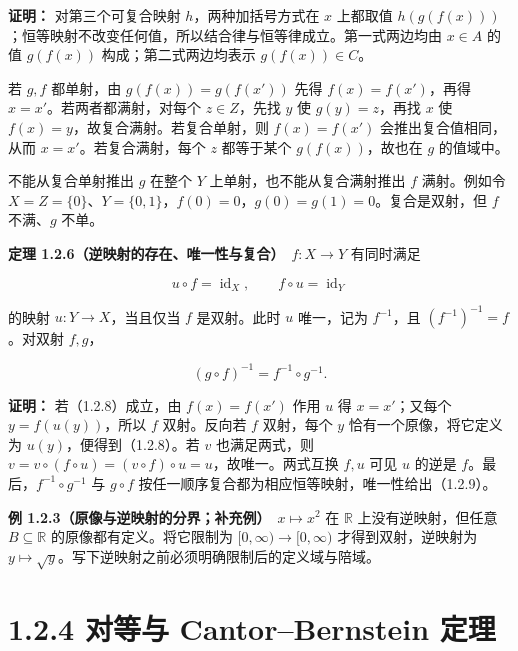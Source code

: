 \documentclass[11pt,a4paper]{article}
\begin{document}
\textbf{证明：} 对第三个可复合映射 \(h\)，两种加括号方式在 \(x\)
上都取值
\(h(g(f(x)))\)；恒等映射不改变任何值，所以结合律与恒等律成立。第一式两边均由
\(x\in A\) 的值 \(g(f(x))\) 构成；第二式两边均表示 \(g(f(x))\in C\)。

若 \(g,f\) 都单射，由 \(g(f(x))=g(f(x'))\) 先得 \(f(x)=f(x')\)，再得
\(x=x'\)。若两者都满射，对每个 \(z\in Z\)，先找 \(y\) 使
\(g(y)=z\)，再找 \(x\) 使 \(f(x)=y\)，故复合满射。若复合单射，则
\(f(x)=f(x')\) 会推出复合值相同，从而 \(x=x'\)。若复合满射，每个 \(z\)
都等于某个 \(g(f(x))\)，故也在 \(g\) 的值域中。

不能从复合单射推出 \(g\) 在整个 \(Y\) 上单射，也不能从复合满射推出 \(f\)
满射。例如令
\(X=Z=\{0\}\)、\(Y=\{0,1\}\)，\(f(0)=0\)，\(g(0)=g(1)=0\)。复合是双射，但
\(f\) 不满、\(g\) 不单。

\textbf{定理 1.2.6（逆映射的存在、唯一性与复合）}　\(f:X\to Y\)
有同时满足

\begin{equation*}
u\circ f=\operatorname{id}_X,\qquad f\circ u=\operatorname{id}_Y
\tag{1.2.8}
\end{equation*}

的映射 \(u:Y\to X\)，当且仅当 \(f\) 是双射。此时 \(u\) 唯一，记为
\(f^{-1}\)，且 \((f^{-1})^{-1}=f\)。对双射 \(f,g\)，

\begin{equation*}
(g\circ f)^{-1}=f^{-1}\circ g^{-1}.
\tag{1.2.9}
\end{equation*}

\textbf{证明：} 若（1.2.8）成立，由 \(f(x)=f(x')\) 作用 \(u\) 得
\(x=x'\)；又每个 \(y=f(u(y))\)，所以 \(f\) 双射。反向若 \(f\) 双射，每个
\(y\) 恰有一个原像，将它定义为 \(u(y)\)，便得到（1.2.8）。若 \(v\)
也满足两式，则
\(v=v\circ(f\circ u)=(v\circ f)\circ u=u\)，故唯一。两式互换 \(f,u\)
可见 \(u\) 的逆是 \(f\)。最后，\(f^{-1}\circ g^{-1}\) 与 \(g\circ f\)
按任一顺序复合都为相应恒等映射，唯一性给出（1.2.9）。

\textbf{例 1.2.3（原像与逆映射的分界；补充例）}　\(x\mapsto x^2\) 在
\(\mathbb R\) 上没有逆映射，但任意 \(B\subseteq\mathbb R\)
的原像都有定义。将它限制为 \([0,\infty)\to[0,\infty)\)
才得到双射，逆映射为
\(y\mapsto\sqrt y\)。写下逆映射之前必须明确限制后的定义域与陪域。

\section[\S{}1.2.4 对等与 Cantor--Bernstein
定理]{1.2.4 对等与 Cantor--Bernstein
定理}\label{ux5bf9ux7b49ux4e0e-cantorbernstein-ux5b9aux7406}
\end{document}

